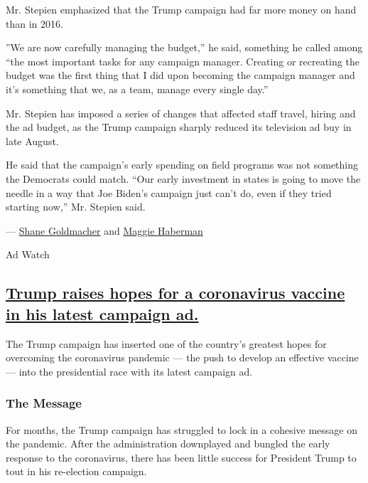 Mr. Stepien emphasized that the Trump campaign had far more money on
hand than in 2016.

''We are now carefully managing the budget,'' he said, something he
called among ``the most important tasks for any campaign manager.
Creating or recreating the budget was the first thing that I did upon
becoming the campaign manager and it's something that we, as a team,
manage every single day.''

Mr. Stepien has imposed a series of changes that affected staff travel,
hiring and the ad budget, as the Trump campaign sharply reduced its
television ad buy in late August.

He said that the campaign's early spending on field programs was not
something the Democrats could match. ``Our early investment in states is
going to move the needle in a way that Joe Biden's campaign just can't
do, even if they tried starting now,'' Mr. Stepien said.

--- \href{https://www.nytimes3xbfgragh.onion/by/shane-goldmacher}{Shane
Goldmacher} and
\href{https://www.nytimes3xbfgragh.onion/by/maggie-haberman}{Maggie
Haberman}

Ad Watch

\hypertarget{trump-raises-hopes-for-a-coronavirus-vaccine-in-his-latest-campaign-ad}{%
\subsection{\texorpdfstring{\protect\hyperlink{trump-raises-hopes-for-a-coronavirus-vaccine-in-his-latest-campaign-ad}{Trump
raises hopes for a coronavirus vaccine in his latest campaign
ad.}}{Trump raises hopes for a coronavirus vaccine in his latest campaign ad.}}\label{trump-raises-hopes-for-a-coronavirus-vaccine-in-his-latest-campaign-ad}}

The Trump campaign has inserted one of the country's greatest hopes for
overcoming the coronavirus pandemic --- the push to develop an effective
vaccine --- into the presidential race with its latest campaign ad.

\hypertarget{the-message}{%
\subsubsection{The Message}\label{the-message}}

For months, the Trump campaign has struggled to lock in a cohesive
message on the pandemic. After the administration downplayed and bungled
the early response to the coronavirus, there has been little success for
President Trump to tout in his re-election campaign.


